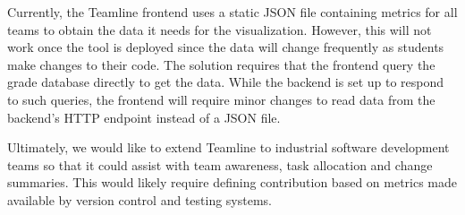 \documentclass[../manifest.tex]{subfiles}
\begin{document}
Currently, the Teamline frontend uses a static JSON file containing metrics for all teams to obtain the data it needs for the visualization. However, this will not work once the tool is deployed since the data will change frequently as students make changes to their code. The solution requires that the frontend query the grade database directly to get the data. While the backend is set up to respond to such queries, the frontend will require minor changes to read data from the backend's HTTP endpoint instead of a JSON file.

Ultimately, we would like to extend Teamline to industrial software development teams so that it could assist with team awareness, task allocation and change summaries. This would likely require defining contribution based on metrics made available by version control and testing systems.




%
\end{document}
